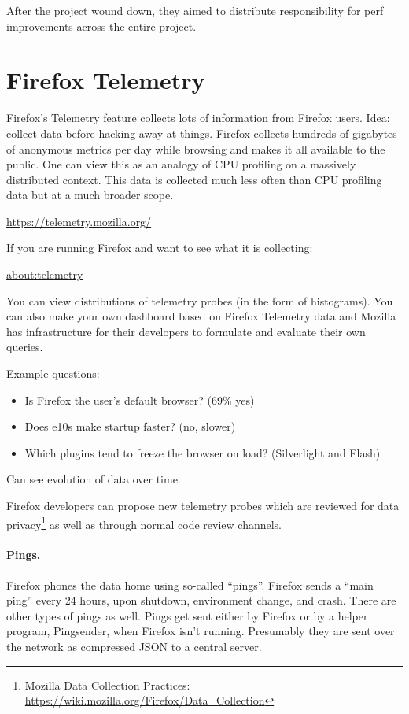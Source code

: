 \documentclass[a4paper]{report}
\begin{document}
After the project wound down, they aimed to distribute responsibility for perf improvements across the entire project.

\section*{Firefox Telemetry}
Firefox's Telemetry feature collects lots of information from Firefox
users.  Idea: collect data before hacking away at things.  Firefox collects hundreds of
gigabytes of anonymous metrics per day while browsing and makes it all available to
the public.  One can view this as an analogy of CPU profiling on a
massively distributed context. This data is collected much less often than
CPU profiling data but at a much broader scope.
\begin{center}
\url{https://telemetry.mozilla.org/}
\end{center}
If you are running Firefox and want to see what it is collecting:
\begin{center}
\url{about:telemetry}
\end{center}

You can view distributions of telemetry probes (in the form of
histograms). You can also make your own dashboard based on Firefox
Telemetry data and Mozilla has infrastructure for their developers to
formulate and evaluate their own queries.

Example questions:
\begin{itemize}[noitemsep]
\item Is Firefox the user's default browser? (69\% yes)
\item Does e10s make startup faster? (no, slower)
\item Which plugins tend to freeze the browser on load? (Silverlight and Flash)
\end{itemize}
Can see evolution of data over time.

Firefox developers can propose new telemetry probes which are reviewed
for data privacy\footnote{Mozilla Data Collection Practices: \url{https://wiki.mozilla.org/Firefox/Data_Collection}} as well as through normal code review channels.

\paragraph{Pings.} Firefox phones the data home using so-called ``pings''.
Firefox sends a ``main ping'' every 24 hours, upon shutdown, environment change,
and crash. There are other types of pings as well. Pings get sent either by Firefox
or by a helper program, Pingsender, when Firefox isn't running. Presumably they
are sent over the network as compressed JSON to a central server.
\end{document}
